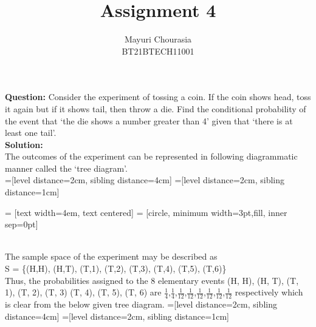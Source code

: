 \documentclass[journal,12pt,twocolumn]{IEEEtran}
\title{Assignment 4}
\author{Mayuri Chourasia\\BT21BTECH11001}
\date{}
\newcommand{\question}{\noindent \textbf{Question: }}
\newcommand{\solution}{\noindent \textbf{Solution: }}
\begin{document}
\maketitle
\question Consider the experiment of tossing a coin. If the coin shows head, toss it
again but if it shows tail, then throw a die. Find the
conditional probability of the event that ‘the die shows
a number greater than 4’ given that ‘there is at least
one tail’.\\
\solution \\
The outcomes of the experiment can be
represented in following diagrammatic manner called
the ‘tree diagram’.\\
=[level distance=2cm, sibling distance=4cm]
=[level distance=2cm, sibling distance=1cm]

 = [text width=4em, text centered]
 = [circle, minimum width=3pt,fill, inner sep=0pt] 
\\

The sample space of the experiment may be
described as\\
    S = \{(H,H), (H,T), (T,1), (T,2), (T,3), (T,4), (T,5), (T,6)\}\\
Thus, the probabilities assigned to the 8 elementary
events (H, H), (H, T), (T, 1), (T, 2), (T, 3) (T, 4), (T, 5), (T, 6) are $\frac{1}{4}$,$\frac{1}{4}$,$\frac{1}{12}$,$\frac{1}{12}$,$\frac{1}{12}$,$\frac{1}{12}$,$\frac{1}{12}$,$\frac{1}{12}$ respectively which is clear from the below given tree diagram.
=[level distance=2cm, sibling distance=4cm]
=[level distance=2cm, sibling distance=1cm]
\end{document}

